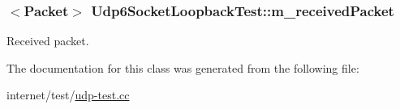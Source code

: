 \subsubsection[{\texorpdfstring{m\+\_\+received\+Packet}{m_receivedPacket}}]{$<${\bf Packet}$>$ Udp6\+Socket\+Loopback\+Test\+::m\+\_\+received\+Packet}\hypertarget{classUdp6SocketLoopbackTest_a9affdeec8230cec75b8315a0ce0def49}{}\label{classUdp6SocketLoopbackTest_a9affdeec8230cec75b8315a0ce0def49}


Received packet. 



The documentation for this class was generated from the following file\+:\begin{DoxyCompactItemize}
\item 
internet/test/\hyperlink{udp-test_8cc}{udp-\/test.\+cc}\end{DoxyCompactItemize}
